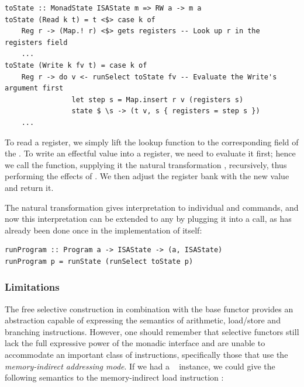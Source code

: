 \vspace{1mm}
\begin{verbatim}
toState :: MonadState ISAState m => RW a -> m a
toState (Read k t) = t <$> case k of
    Reg r -> (Map.! r) <$> gets registers -- Look up r in the registers field
    ...
toState (Write k fv t) = case k of
    Reg r -> do v <- runSelect toState fv -- Evaluate the Write's argument first
                let step s = Map.insert r v (registers s)
                state $ \s -> (t v, s { registers = step s })
    ...
\end{verbatim}
\vspace{1mm}

\noindent
To read a register, we simply lift the lookup function  to the
corresponding field of the . To write an effectful value 
into a register, we need to evaluate it first; hence we call the 
function, supplying it the natural transformation , recursively,
thus performing the effects of . We then adjust the register bank with
the new value and return it.

The natural transformation  gives interpretation to individual
 and  commands, and now this interpretation can be extended
to any  by plugging it into a  call, as has already
been done once in the implementation of  itself:

\vspace{1mm}
\begin{verbatim}
runProgram :: Program a -> ISAState -> (a, ISAState)
runProgram p = runState (runSelect toState p)
\end{verbatim}

\subsubsection{Limitations}

The free selective construction in combination with the base functor 
provides an abstraction capable of expressing the semantics of arithmetic,
load/store and branching instructions. However, one should remember that
selective functors still lack the full expressive power of the monadic interface
and are unable to accommodate an important class of instructions, specifically
those that use the \emph{memory-indirect addressing mode}. If we had a
~ instance, we could give the following semantics to the
memory-indirect load instruction :

